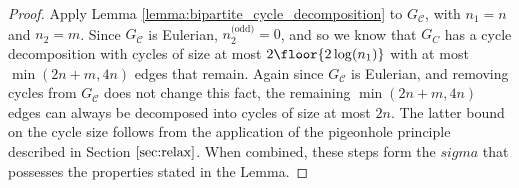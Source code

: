 \documentclass[10pt]{article}
\begin{document}
\begin{ReviewVerbatim}

		\begin{proof}
			Apply Lemma \ref{lemma:bipartite_cycle_decomposition} to $G_\mathcal{C}$, with $n_1 = n$ and $n_2 = m$. Since $G_\mathcal{C}$ is Eulerian, $n_2^\text{(odd)} = 0$, and so we know that $G_C$ has a cycle decomposition with cycles of size at most $2 \floor{2 \log(n_1)}$ with at most $\min(2n + m, 4n)$ edges that remain. Again since $G_\mathcal{C}$ is Eulerian, and removing cycles from $G_\mathcal{C}$ does not change this fact, the remaining $\min(2n + m, 4n)$ edges can always be decomposed into cycles of size at most $2n$. The latter bound on the cycle size follows from the application of the pigeonhole principle described in Section $\ref{sec:relax}$. When combined, these steps form the $sigma$ that possesses the properties stated in the Lemma.


\end{proof}
\end{ReviewVerbatim}
\end{document}
